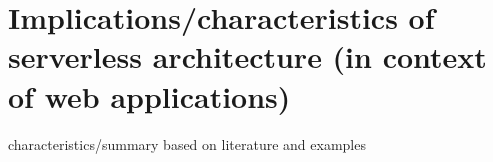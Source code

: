




\section*{Implications/characteristics of serverless architecture (in context of web applications)}

characteristics/summary based on literature and examples



